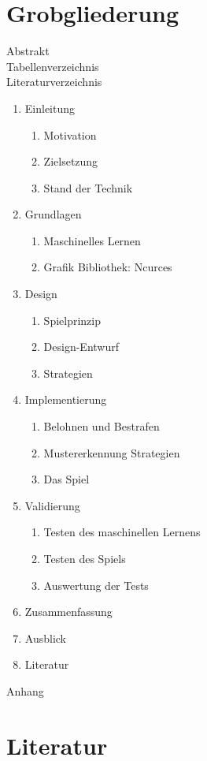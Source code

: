 \documentclass[12pt,a4paper]{article}
\begin{document}
\section*{Grobgliederung}
Abstrakt\\
Tabellenverzeichnis\\
Literaturverzeichnis
\begin{enumerate}
	\item Einleitung
	\begin{enumerate}
		\item Motivation
		\item Zielsetzung
		\item Stand der Technik
	\end{enumerate}
	\item Grundlagen
	\begin{enumerate}
		\item Maschinelles Lernen
		\item Grafik Bibliothek: Ncurces
	\end{enumerate}
	\item Design
	\begin{enumerate}
		\item Spielprinzip
		\item Design-Entwurf
		\item Strategien
	\end{enumerate}
	\item Implementierung
	\begin{enumerate}
		\item Belohnen und Bestrafen
		\item Mustererkennung Strategien
		\item Das Spiel 
	\end{enumerate}
	\item Validierung
	\begin{enumerate}
		\item Testen des maschinellen Lernens
		\item Testen des Spiels
		\item Auswertung der Tests
	\end{enumerate}
	\item Zusammenfassung
	\item Ausblick
	\item Literatur	
\end{enumerate}
Anhang

\section*{Literatur}
\end{document}
